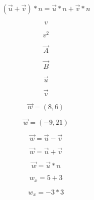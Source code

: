 \documentclass[12pt, a4paper]{article}
\begin{document}
\begin{equation}
\label{uvtimesn}
(\vec{u} + \vec{v}) * n = \vec{u} * n + \vec{v} * n
\end{equation}

\begin{equation}
\label{v}
v
\end{equation}

\begin{equation}
\label{v2}
v^2
\end{equation}

\begin{equation}
\label{vectora}
\vec{A}
\end{equation}

\begin{equation}
\label{vectorb}
\vec{B}
\end{equation}

\begin{equation}
\label{vectoru}
\vec{u}
\end{equation}

\begin{equation}
\label{vectorv}
\vec{v}
\end{equation}

\begin{equation}
\label{w86}
\vec{w} = (8, 6)
\end{equation}

\begin{equation}
\label{wequals}
\vec{w} = (-9, 21)
\end{equation}

\begin{equation}
\label{wuminusv}
\vec{w} = \vec{u} - \vec{v}
\end{equation}

\begin{equation}
\label{wuplusv}
\vec{w} = \vec{u} + \vec{v}
\end{equation}

\begin{equation}
\label{wutimesn}
\vec{w} = \vec{u} * n
\end{equation}

\begin{equation}
\label{wx53}
w_x = 5 + 3
\end{equation}

\begin{equation}
\label{wxequals}
w_x = -3 * 3
\end{equation}
\end{document}
